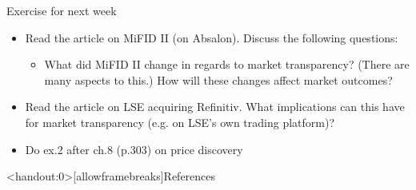 \documentclass[english,10pt
,aspectratio=169
]{beamer}
\begin{document}
\begin{frame}{Exercise for next week}
	\begin{itemize}
		\item Read the article on MiFID II (on Absalon). Discuss the following questions:
		\begin{itemize}
			\item What did MiFID II change in regards to market transparency? (There are many aspects to this.) How will these changes affect market outcomes?
		\end{itemize}
		\item Read the article on LSE acquiring Refinitiv. What implications can this have for market transparency (e.g. on LSE's own trading platform)?
		\item Do ex.2 after ch.8 (p.303) on price discovery
	\end{itemize}
\end{frame}


\appendix
\begin{frame}<handout:0>[allowframebreaks]{References}
	
	
\end{frame}
\end{document}
